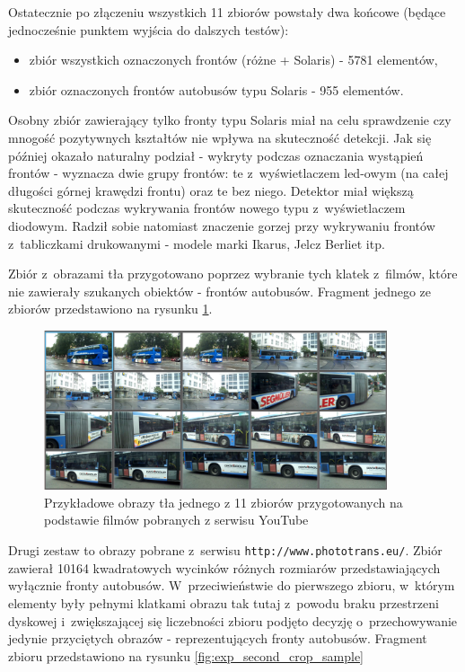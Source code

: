 Ostatecznie po złączeniu wszystkich 11 zbiorów powstały
dwa końcowe (będące jednocześnie punktem wyjścia do dalszych testów):
\begin{itemize}
    \item zbiór wszystkich oznaczonych frontów (różne + Solaris) 
        - 5781 elementów,
    \item zbiór oznaczonych frontów autobusów typu Solaris - 955
	    elementów.
\end{itemize}

Osobny zbiór zawierający tylko fronty typu Solaris miał na celu
sprawdzenie czy mnogość pozytywnych kształtów nie wpływa na skuteczność
detekcji. Jak się później okazało naturalny podział
- wykryty podczas oznaczania wystąpień frontów - 
wyznacza dwie grupy frontów: te z~wyświetlaczem led-owym (na całej
długości górnej krawędzi frontu) oraz te bez niego. Detektor
miał większą skuteczność podczas wykrywania frontów nowego typu
z~wyświetlaczem diodowym. Radził sobie natomiast znaczenie gorzej przy
wykrywaniu frontów z~tabliczkami drukowanymi - modele marki
Ikarus, Jelcz Berliet itp.

Zbiór z~obrazami tła
przygotowano poprzez wybranie tych klatek z~filmów, które nie
zawierały szukanych obiektów - frontów autobusów. Fragment
jednego ze zbiorów przedstawiono na rysunku \ref{fig:exp_first_background_sample}.

\begin{figure}[!h]
	\centering
	\includegraphics[width=0.9\textwidth]{img/exp_first_background_sample}
	\caption{Przykładowe obrazy tła jednego z 11 zbiorów
		przygotowanych na podstawie
		filmów pobranych z serwisu YouTube}
	\label{fig:exp_first_background_sample}
\end{figure}

Drugi zestaw
to obrazy pobrane z~serwisu \verb|http://www.phototrans.eu/|.
Zbiór zawierał 10164 kwadratowych wycinków różnych rozmiarów
przedstawiających wyłącznie fronty autobusów. W~przeciwieństwie
do pierwszego zbioru, w~którym elementy były pełnymi klatkami
obrazu tak tutaj z~powodu braku przestrzeni dyskowej
i~zwiększającej się liczebności zbioru podjęto decyzję o~przechowywanie
jedynie przyciętych obrazów - reprezentujących fronty autobusów.
Fragment zbioru przedstawiono na rysunku \ref{fig:exp_second_crop_sample}

